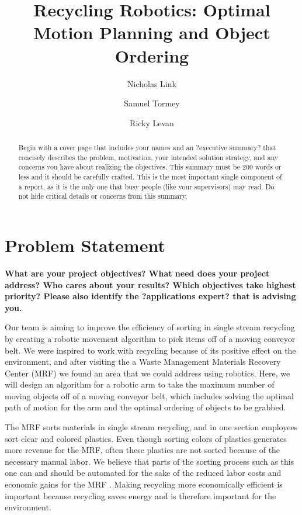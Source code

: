 \documentclass [11pt ]{ report}
\title{Recycling Robotics: Optimal Motion Planning and Object Ordering}
\author{Nicholas Link
\and Samuel Tormey
\and Ricky Levan}
\renewcommand{\b}{\textbf}
\begin{document}
\maketitle


\begin{abstract}
Begin with a cover page that includes your names and an ?executive summary? that concisely
describes the problem, motivation, your intended solution strategy, and any concerns you
have about realizing the objectives. This summary must be 200 words or less and it should
be carefully crafted.
This is the most important single component of a report, as it is the only one that busy people
(like your supervisors) may read. Do not hide critical details or concerns from this summary.
\end{abstract}

\section{Problem Statement}

\b{What are your project objectives? What need does your project address?
Who cares about your results? Which objectives take highest priority? Please also identify
the ?applications expert? that is advising you.} 

Our team is aiming to improve the efficiency of sorting in single stream recycling by creating a robotic movement algorithm to pick items off of a moving conveyor belt. We were inspired to work with recycling because of its positive effect on the environment, and after visiting the a Waste Management Materials Recovery Center (MRF) we found an area that we could address using robotics. Here, we will design an algorithm for a robotic arm to take the maximum number of moving objects off of a moving conveyor belt, which includes solving the optimal path of motion for the arm and the optimal ordering of objects to be grabbed.

The MRF sorts materials in single stream recycling, and in one section employees sort clear and colored plastics. Even though sorting colors of plastics generates more revenue for the MRF, often these plastics are not sorted because of the necessary manual labor. We believe that parts of the sorting process such as this one can and should be automated for the sake of the reduced labor costs and economic gains for the MRF . Making recycling more economically efficient is important because recycling saves energy and is therefore important for the environment. 
\end{document}
